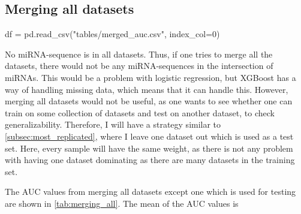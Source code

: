 {{{{{{{\subsection{Merging all datasets}
\label{subsec:merging_all}
\begin{pycode}
df = pd.read_csv("tables/merged_auc.csv", index_col=0)
\end{pycode}
No miRNA-sequence is in all datasets. Thus, if one tries to merge all the datasets, there would not be any miRNA-sequences in the intersection of miRNAs. This would be a problem with logistic regression, but XGBoost has a way of handling missing data, which means that it can handle this. However, merging all datasets would not be useful, as one wants to see whether one can train on some collection of datasets and test on another dataset, to check generalizability. Therefore, I will have a strategy similar to \autoref{subsec:most_replicated}, where I leave one dataset out which is used as a test set. Here, every sample will have the same weight, as there is not any problem with having one dataset dominating as there are many datasets in the training set.

The AUC values from merging all datasets except one which is used for testing are shown in \autoref{tab:merging_all}. The mean of the AUC values is \py{"$%

 

\begin{table}
    \caption{AUC when merging all datasets except one which is used for testing, as described in \autoref{subsec:merging_all}}
    \label{tab:merging_all}
    \sisetup{round-mode=places, round-precision=3}
    \begin{center}
        \csvreader[head to column names, tabular=|r|c|,
        table head = \hline \bfseries Test set & \bfseries AUC \\\hline,
        late after line=\\, late after last line=\\\hline]{tables/merged_auc.csv}{}{
            \citet{\Study} & \num{\AUC}
        }
    \end{center}
\end{table}

\subsection{Maximal training sets}
\begin{pycode}
df = pd.read_csv("tables/auc_maximal.csv", index_col=0)
\end{pycode}

}}}}}}}}

